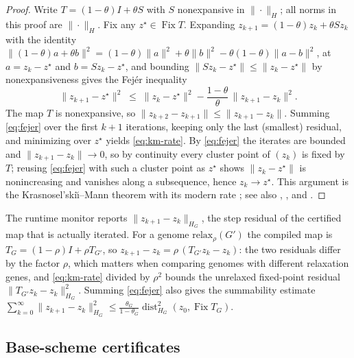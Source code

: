 \begin{proof}
Write $T=(1-\theta)I+\theta S$ with $S$ nonexpansive in $\|\cdot\|_H$; all
norms in this proof are $\|\cdot\|_H$. Fix any
$z^\star\in\operatorname{Fix}T$. Expanding $z_{k+1}=(1-\theta)z_k+\theta
Sz_k$ with the identity
$\|(1-\theta)a+\theta b\|^2=(1-\theta)\|a\|^2+\theta\|b\|^2
-\theta(1-\theta)\|a-b\|^2$, at $a=z_k-z^\star$ and $b=Sz_k-z^\star$, and
bounding $\|Sz_k-z^\star\|\leq\|z_k-z^\star\|$ by nonexpansiveness gives the
Fej\'er inequality
\begin{equation}
 \|z_{k+1}-z^\star\|^2
 \;\leq\;
 \|z_k-z^\star\|^2-\frac{1-\theta}{\theta}\,\|z_{k+1}-z_k\|^2 .
 \label{eq:fejer}
\end{equation}
The map $T$ is nonexpansive, so
$\|z_{k+2}-z_{k+1}\|\leq\|z_{k+1}-z_k\|$. Summing \eqref{eq:fejer} over the
first $k+1$ iterations, keeping only the last (smallest) residual, and
minimizing over $z^\star$ yields \eqref{eq:km-rate}. By \eqref{eq:fejer} the
iterates are bounded and $\|z_{k+1}-z_k\|\to0$, so by continuity every
cluster point of $(z_k)$ is fixed by $T$; reusing \eqref{eq:fejer} with such
a cluster point as $z^\star$ shows $\|z_k-z^\star\|$ is nonincreasing and
vanishes along a subsequence, hence $z_k\to z^\star$. This argument is the
Krasnosel'ski\u{\i}--Mann theorem with its modern rate
\citep[Theorem~1]{RyuYin2022LargeScale}; see also
\citet{Krasnoselskii1955Two}, \citet{Mann1953Mean}, and
\citet{BauschkeCombettes2017Convex}.
\end{proof}

\begin{remark}
\label{rem:monitored-residual}
The runtime monitor reports $\|z_{k+1}-z_k\|_{H_G}$, the step residual of the
certified map that is actually iterated. For a genome
$\mathrm{relax}_\rho(G')$ the compiled map is
$T_G=(1-\rho)I+\rho T_{G'}$, so
$z_{k+1}-z_k=\rho\,(T_{G'}z_k-z_k)$: the two residuals differ by the factor
$\rho$, which matters when comparing genomes with different relaxation genes,
and \eqref{eq:km-rate} divided by $\rho^2$ bounds the unrelaxed fixed-point
residual $\|T_{G'}z_k-z_k\|_{H_G}^2$. Summing \eqref{eq:fejer} also gives the
summability estimate
$\sum_{k=0}^{\infty}\|z_{k+1}-z_k\|_{H_G}^2\leq
\frac{\theta_G}{1-\theta_G}\operatorname{dist}_{H_G}^2
(z_0,\operatorname{Fix}T_G)$.
\end{remark}

\subsection{Base-scheme certificates}

